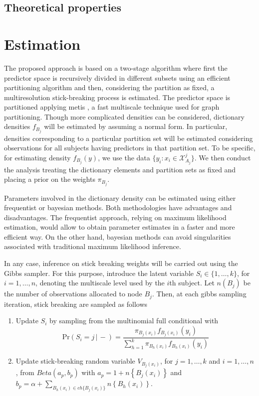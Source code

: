 \documentclass{article}
\begin{document}
\subsection{Theoretical properties} 

\section{Estimation}

The proposed approach is based on a two-stage algorithm where first the predictor space is recursively divided in different subsets using an efficient partitioning algorithm and then, considering the partition as fixed, a multiresolution stick-breaking process is estimated.  The predictor space is partitioned applying metis \cite{metis}, a fast multiscale technique used for graph partitioning. Though more complicated densities can be considered, dictionary densities $f_{B_j}$ will be estimated by assuming a normal form. In particular, densities corresponding to a particular partition set will be estimated considering observations for all subjects having predictors in that partition set. To be specific, for estimating density $f_{B_j}(y)$, we use the data $\{ y_i: x_i \in \mathcal{X}^j_{A_j} \}$. We then conduct the analysis treating the dictionary elements and partition sets as fixed and placing a prior on the weights $\pi_{B_j}$. 

Parameters involved in the dictionary density can be estimated using either frequentist or bayesian methods. Both methodologies have advantages and disadvantages. The frequentist approach, relying on maximum likelihood estimation, would allow to obtain parameter estimates in a faster and more efficient way. On the other hand, bayesian methods can avoid singularities associated with traditional maximum likelihood inference. 

In any case, inference on stick breaking weights will be carried out using the Gibbs sampler. For this purpose, introduce the latent variable $S_i \in \{1,\ldots,k\}$, for $i=1,\ldots,n$, denoting the multiscale level used by the $i$th subject. Let $n(B_j)$ be the number of observations allocated to node $B_j$. Then, at each gibbs sampling iteration, stick breaking are sampled as follows 
\begin{enumerate}
\item Update $S_i$ by sampling from the multinomial full conditional with 
\[\mbox{Pr}( S_i = j\, |\, -) = \frac{ \pi_{B_j(x_i)}f_{B_j(x_i)}(y_i) }{ \sum_{h=1}^k \pi_{B_h(x_i)}f_{B_h(x_i)}(y_i) } \label{eq:prS}\]
\item Update stick-breaking random variable $V_{B_j(x_i)}$, for $j=1, \ldots, k$ and $i=1, \ldots, n$, from $Beta(a_p,b_p)$ with $a_p=1+n\left\{B_j(x_i)\right\}$ and $b_p=\alpha+\sum_{B_h(x_i) \in ch\{B_j(x_i)\}} n\left\{B_h(x_i)\right\}$.
\end{enumerate}
\end{document}
